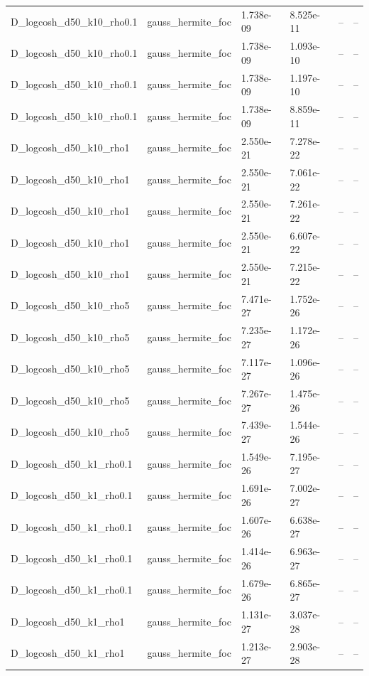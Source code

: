 \begin{tabular}{llllll}
D\_logcosh\_d50\_k10\_rho0.1 & gauss\_hermite\_foc & 1.738e-09 & 8.525e-11 & -- & -- \\
D\_logcosh\_d50\_k10\_rho0.1 & gauss\_hermite\_foc & 1.738e-09 & 1.093e-10 & -- & -- \\
D\_logcosh\_d50\_k10\_rho0.1 & gauss\_hermite\_foc & 1.738e-09 & 1.197e-10 & -- & -- \\
D\_logcosh\_d50\_k10\_rho0.1 & gauss\_hermite\_foc & 1.738e-09 & 8.859e-11 & -- & -- \\
D\_logcosh\_d50\_k10\_rho1 & gauss\_hermite\_foc & 2.550e-21 & 7.278e-22 & -- & -- \\
D\_logcosh\_d50\_k10\_rho1 & gauss\_hermite\_foc & 2.550e-21 & 7.061e-22 & -- & -- \\
D\_logcosh\_d50\_k10\_rho1 & gauss\_hermite\_foc & 2.550e-21 & 7.261e-22 & -- & -- \\
D\_logcosh\_d50\_k10\_rho1 & gauss\_hermite\_foc & 2.550e-21 & 6.607e-22 & -- & -- \\
D\_logcosh\_d50\_k10\_rho1 & gauss\_hermite\_foc & 2.550e-21 & 7.215e-22 & -- & -- \\
D\_logcosh\_d50\_k10\_rho5 & gauss\_hermite\_foc & 7.471e-27 & 1.752e-26 & -- & -- \\
D\_logcosh\_d50\_k10\_rho5 & gauss\_hermite\_foc & 7.235e-27 & 1.172e-26 & -- & -- \\
D\_logcosh\_d50\_k10\_rho5 & gauss\_hermite\_foc & 7.117e-27 & 1.096e-26 & -- & -- \\
D\_logcosh\_d50\_k10\_rho5 & gauss\_hermite\_foc & 7.267e-27 & 1.475e-26 & -- & -- \\
D\_logcosh\_d50\_k10\_rho5 & gauss\_hermite\_foc & 7.439e-27 & 1.544e-26 & -- & -- \\
D\_logcosh\_d50\_k1\_rho0.1 & gauss\_hermite\_foc & 1.549e-26 & 7.195e-27 & -- & -- \\
D\_logcosh\_d50\_k1\_rho0.1 & gauss\_hermite\_foc & 1.691e-26 & 7.002e-27 & -- & -- \\
D\_logcosh\_d50\_k1\_rho0.1 & gauss\_hermite\_foc & 1.607e-26 & 6.638e-27 & -- & -- \\
D\_logcosh\_d50\_k1\_rho0.1 & gauss\_hermite\_foc & 1.414e-26 & 6.963e-27 & -- & -- \\
D\_logcosh\_d50\_k1\_rho0.1 & gauss\_hermite\_foc & 1.679e-26 & 6.865e-27 & -- & -- \\
D\_logcosh\_d50\_k1\_rho1 & gauss\_hermite\_foc & 1.131e-27 & 3.037e-28 & -- & -- \\
D\_logcosh\_d50\_k1\_rho1 & gauss\_hermite\_foc & 1.213e-27 & 2.903e-28 & -- & -- \\

\end{tabular}
